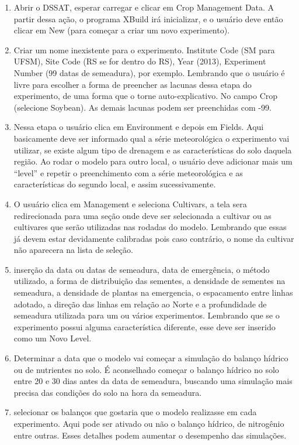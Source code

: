 \documentclass[12pt]{article}
\begin{document}
	\begin{enumerate}
		\item  Abrir o DSSAT, esperar carregar e clicar em Crop Management Data. A partir dessa ação, o programa XBuild irá inicializar, e o usuário deve então clicar em New (para começar a criar um novo experimento).
		\item  Criar um nome inexistente para o experimento. Institute Code (SM para UFSM), Site Code (RS se for dentro do RS), Year (2013), Experiment Number (99 datas de semeadura), por exemplo. Lembrando que o usuário é livre para escolher a forma de preencher as lacunas dessa etapa do experimento, de uma forma que o torne auto-explicativo. No campo Crop (selecione Soybean). As demais lacunas podem ser preenchidas com -99.
		\item Nessa etapa o usuário clica em Environment e depois em Fields. Aqui basicamente deve ser informado qual a série meteorológica o experimento vai utilizar, se existe algum tipo de drenagem e as características do solo daquela região. Ao rodar o modelo para outro local, o usuário deve adicionar mais um “level” e repetir o preenchimento com a série meteorológica e as características do segundo local, e assim sucessivamente.  
		\item O usuário clica em Management e seleciona Cultivars, a tela sera redirecionada para uma seção onde deve ser selecionada a cultivar ou as cultivares que serão utilizadas nas rodadas do modelo. Lembrando que essas já devem estar devidamente calibradas pois caso contrário, o nome da cultivar não aparecera na lista de seleção.
		\item inserção da data ou datas de semeadura, data de emergência, o método utilizado, a forma de distribuição das sementes, a densidade de sementes na semeadura, a densidade de plantas na emergencia, o espacamento entre linhas adotado, a direção das linhas em relação ao Norte e a profundidade de semeadura utilizada para um ou vários experimentos. Lembrando que se o experimento possui alguma característica diferente, esse deve ser inserido como um Novo Level.
		\item Determinar a data que o modelo vai começar a simulação do balanço hídrico ou de nutrientes no solo. É aconselhado começar o balanço hídrico no solo entre 20 e 30 dias antes da data de semeadura, buscando uma simulação mais precisa das condições do solo na hora da semeadura.
		\item selecionar os balanços que gostaria que o modelo realizasse em cada experimento. Aqui pode ser ativado ou não o balanço hídrico, de nitrogênio entre outras. Esses detalhes podem aumentar o desempenho das simulações.

\end{enumerate}
\end{document}
